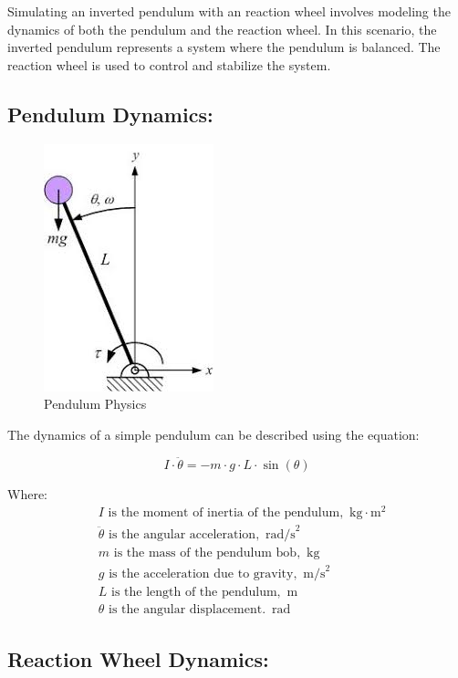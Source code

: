 \documentclass{article}
\begin{document}
\begin{multicols}{2}
Simulating an inverted pendulum with an reaction wheel involves modeling the dynamics of both the pendulum and the reaction wheel. In this scenario, the inverted pendulum represents a system where the pendulum is balanced. The reaction wheel is used to control and stabilize the system.

\subsection{Pendulum Dynamics:}

\begin{figure}[H]
\centering
\includegraphics[scale=0.5]{images}
\caption{Pendulum Physics}
\label{fig:Pendulum Physics}
\end{figure}
The dynamics of a simple pendulum can be described using the equation:

\[
I \cdot \ddot{\theta} = -m \cdot g \cdot L \cdot \sin(\theta)
\]

Where:
\begin{align*}
&I \text{ is the moment of inertia of the pendulum,  } \, \text{kg} \cdot \text{m}^2\\
&\ddot{\theta} \text{ is the angular acceleration,  } \, \text{rad/s}^2\\
&m \text{ is the mass of the pendulum bob,  } \, \text{kg}\\
&g \text{ is the acceleration due to gravity,  } \, \text{m/s}^2\\
&L \text{ is the length of the pendulum,  } \, \text{m}\\
&\theta \text{ is the angular displacement.  } \, \text{rad}
\end{align*}
      

\subsection{Reaction Wheel Dynamics:}


\end{multicols}
\end{document}
